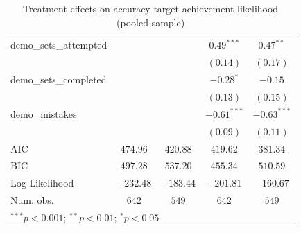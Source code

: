 \documentclass[
  12,
  letterpaper,
  DIV=11,
  numbers=noendperiod]{scrartcl}
\begin{document}
\begin{table}
{\begin{center}
\begin{tabular}{l c c c c}
demo\_sets\_attempted           &               &               & $0.49^{***}$  & $0.47^{**}$   \\
                                &               &               & $(0.14)$      & $(0.17)$      \\
demo\_sets\_completed           &               &               & $-0.28^{*}$   & $-0.15$       \\
                                &               &               & $(0.13)$      & $(0.15)$      \\
demo\_mistakes                  &               &               & $-0.61^{***}$ & $-0.63^{***}$ \\
                                &               &               & $(0.09)$      & $(0.11)$      \\
\hline
AIC                             & $474.96$      & $420.88$      & $419.62$      & $381.34$      \\
BIC                             & $497.28$      & $537.20$      & $455.34$      & $510.59$      \\
Log Likelihood                  & $-232.48$     & $-183.44$     & $-201.81$     & $-160.67$     \\
Num. obs.                       & $642$         & $549$         & $642$         & $549$         \\
\hline
\multicolumn{5}{l}{\scriptsize{$^{***}p<0.001$; $^{**}p<0.01$; $^{*}p<0.05$}}
\end{tabular}
\label{table:coefficients}
\end{center}

}

\caption{\label{tbl-reg-target-full}Treatment effects on accuracy target
achievement likelihood (pooled sample)}

\end{table}%
\end{document}
